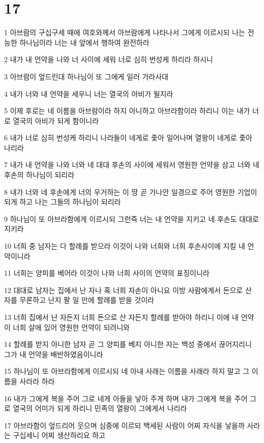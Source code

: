 \chapter{17}

\par 1 아브람의 구십구세 때에 여호와께서 아브람에게 나타나서 그에게 이르시되 나는 전능한 하나님이라 너는 내 앞에서 행하여 완전하라
\par 2 내가 내 언약을 나와 너 사이에 세워 너로 심히 번성케 하리라 하시니
\par 3 아브람이 엎드린대 하나님이 또 그에게 일러 가라사대
\par 4 내가 너와 내 언약을 세우니 너는 열국의 아비가 될지라
\par 5 이제 후로는 네 이름을 아브람이라 하지 아니하고 아브라함이라 하리니 이는 내가 너로 열국의 아비가 되게 함이니라
\par 6 내가 너로 심히 번성케 하리니 나라들이 네게로 좇아 일어나며 열왕이 네게로 좇아 나리라
\par 7 내가 내 언약을 나와 너와 네 대대 후손의 사이에 세워서 영원한 언약을 삼고 너와 네 후손의 하나님이 되리라
\par 8 내가 너와 네 후손에게 너의 우거하는 이 땅 곧 가나안 일경으로 주어 영원한 기업이 되게 하고 나는 그들의 하나님이 되리라
\par 9 하나님이 또 아브라함에게 이르시되 그런즉 너는 내 언약을 지키고 네 후손도 대대로 지키라
\par 10 너희 중 남자는 다 할례를 받으라 이것이 나와 너희와 너희 후손사이에 지킬 내 언약이니라
\par 11 너희는 양피를 베어라 이것이 나와 너희 사이의 언약의 표징이니라
\par 12 대대로 남자는 집에서 난 자나 혹 너희 자손이 아니요 이방 사람에게서 돈으로 산 자를 무론하고 난지 팔 일 만에 할례를 받을 것이라
\par 13 너희 집에서 난 자든지 너희 돈으로 산 자든지 할례를 받아야 하리니 이에 내 언약이 너희 살에 있어 영원한 언약이 되려니와
\par 14 할례를 받지 아니한 남자 곧 그 양피를 베지 아니한 자는 백성 중에서 끊어지리니 그가 내 언약을 배반하였음이니라
\par 15 하나님이 또 아브라함에게 이르시되 네 아내 사래는 이름을 사래라 하지 말고 그 이름을 사라라 하라
\par 16 내가 그에게 복을 주어 그로 네게 아들을 낳아 주게 하며 내가 그에게 복을 주어 그로 열국의 어미가 되게 하리니 민족의 열왕이 그에게서 나리라
\par 17 아브라함이 엎드리어 웃으며 심중에 이르되 백세된 사람이 어찌 자식을 낳을까 사라는 구십세니 어찌 생산하리요 하고
